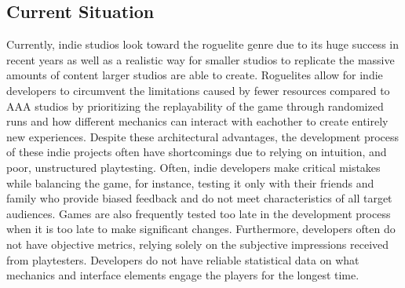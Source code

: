 \subsection*{Current Situation}
Currently, indie studios look toward the roguelite genre due to its huge success in recent years as well as a realistic way for smaller studios to replicate the massive amounts of content larger studios are able to create. Roguelites allow for indie developers to circumvent the limitations caused by fewer resources compared to AAA studios by prioritizing the replayability of the game through randomized runs and how different mechanics can interact with eachother to create entirely new experiences.
\newline
\newline
Despite these architectural advantages, the development process of these indie projects often have shortcomings due to relying on intuition, and poor, unstructured playtesting. Often, indie developers make critical mistakes while balancing the game, for instance, testing it only with their friends and family who provide biased feedback and do not meet characteristics of all target audiences. Games are also frequently tested too late in the development process when it is too late to make significant changes. Furthermore, developers often do not have objective metrics, relying solely on the subjective impressions received from playtesters. Developers do not have reliable statistical data on what mechanics and interface elements engage the players for the longest time.
